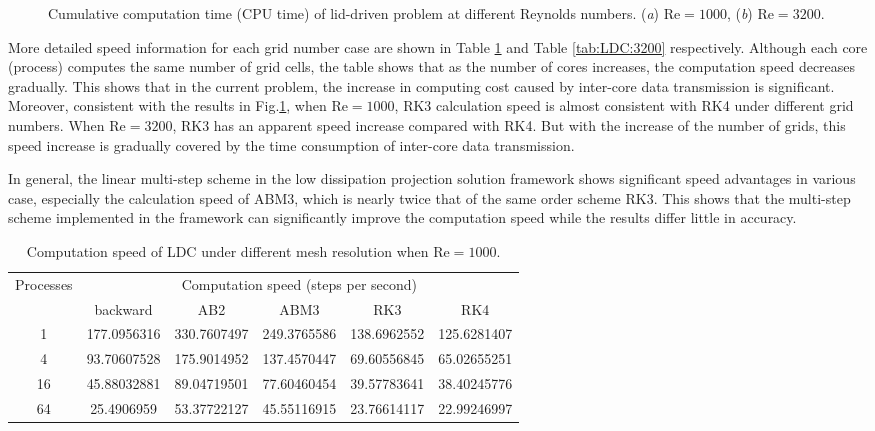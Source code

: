 \documentclass{article}
\begin{document}
\begin{figure}
	\centering
	\caption{Cumulative computation time (CPU time) of lid-driven problem at different Reynolds numbers. (\textit{a}) $\mathrm{Re}=1000$, (\textit{b}) $\mathrm{Re}=3200$.}
	\label{fig:LDC:speed}
\end{figure}

More detailed speed information for each grid number case are shown in Table \ref{tab:LDC:1000} and Table \ref{tab:LDC:3200} respectively. Although each core (process) computes the same number of grid cells, the table shows that as the number of cores increases, the computation speed decreases gradually. This shows that in the current problem, the increase in computing cost caused by inter-core data transmission is significant. Moreover, consistent with the results in Fig.\ref{fig:LDC:speed}, when $\mathrm{Re}=1000$, RK3 calculation speed is almost consistent with RK4 under different grid numbers. When $\mathrm{Re}=3200$, RK3 has an apparent speed increase compared with RK4. But with the increase of the number of grids, this speed increase is gradually covered by the time consumption of inter-core data transmission.

In general, the linear multi-step scheme in the low dissipation projection solution framework shows significant speed advantages in various case, especially the calculation speed of ABM3, which is nearly twice that of the same order scheme RK3. This shows that the multi-step scheme implemented in the framework can significantly improve the computation speed while the results differ little in accuracy.

\begin{table}
  \caption{Computation speed of LDC under different mesh resolution when $\mathrm{Re}=1000$.}
  \centering
  \begin{tabular}{cccccc}
    \toprule
    \multirow{2}{*}{Processes} & \multicolumn{5}{c}{Computation speed (steps per second)}            \\
    \cmidrule{2-6}
                               & backward    & AB2         & ABM3        & RK3         & RK4         \\
    \midrule
    1                          & 177.0956316 & 330.7607497 & 249.3765586 & 138.6962552 & 125.6281407 \\
    4                          & 93.70607528 & 175.9014952 & 137.4570447 & 69.60556845 & 65.02655251 \\
    16                         & 45.88032881 & 89.04719501 & 77.60460454 & 39.57783641 & 38.40245776 \\
    64                         & 25.4906959  & 53.37722127 & 45.55116915 & 23.76614117 & 22.99246997 \\
    \bottomrule
    \end{tabular}
  \label{tab:LDC:1000}
\end{table}
\end{document}
